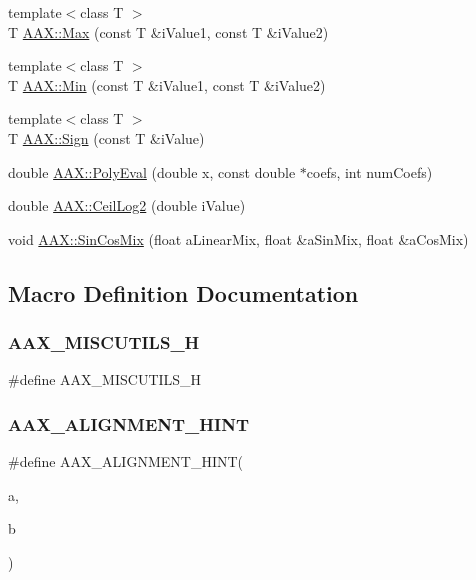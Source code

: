 \begin{DoxyCompactItemize}
\item 
{\footnotesize template$<$class T $>$ }\\T \mbox{\hyperlink{a00852_a55ac62cf1b543338c58f8dd0d747c56c}{A\+A\+X\+::\+Max}} (const T \&i\+Value1, const T \&i\+Value2)
\item 
{\footnotesize template$<$class T $>$ }\\T \mbox{\hyperlink{a00852_a38c17ad30c1eb394bfa06e662d8d2598}{A\+A\+X\+::\+Min}} (const T \&i\+Value1, const T \&i\+Value2)
\item 
{\footnotesize template$<$class T $>$ }\\T \mbox{\hyperlink{a00852_ab6a3e1aef81cd84dec2eee9a27755bb0}{A\+A\+X\+::\+Sign}} (const T \&i\+Value)
\item 
double \mbox{\hyperlink{a00852_aa0094a6a87ca0c48f58b48ce5eea636e}{A\+A\+X\+::\+Poly\+Eval}} (double x, const double $\ast$coefs, int num\+Coefs)
\item 
double \mbox{\hyperlink{a00852_aad5df8c4502619ca12136a2f7b8d8a06}{A\+A\+X\+::\+Ceil\+Log2}} (double i\+Value)
\item 
void \mbox{\hyperlink{a00852_a3826233eb62186c03bb093f1031ca8f4}{A\+A\+X\+::\+Sin\+Cos\+Mix}} (float a\+Linear\+Mix, float \&a\+Sin\+Mix, float \&a\+Cos\+Mix)
\end{DoxyCompactItemize}


\subsection{Macro Definition Documentation}
\mbox{\label{a00770_a89034ace563ff82face40a019fc93063}} 
\subsubsection{\texorpdfstring{AAX\_MISCUTILS\_H}{AAX\_MISCUTILS\_H}}
{\footnotesize\ttfamily \#define A\+A\+X\+\_\+\+M\+I\+S\+C\+U\+T\+I\+L\+S\+\_\+H}

\mbox{\label{a00770_a7eb399409be7572c8bd589395c450cdc}} 
\subsubsection{\texorpdfstring{AAX\_ALIGNMENT\_HINT}{AAX\_ALIGNMENT\_HINT}}
{\footnotesize\ttfamily \#define A\+A\+X\+\_\+\+A\+L\+I\+G\+N\+M\+E\+N\+T\+\_\+\+H\+I\+NT(\begin{DoxyParamCaption}\item[{}]{a,  }\item[{}]{b }\end{DoxyParamCaption})}



